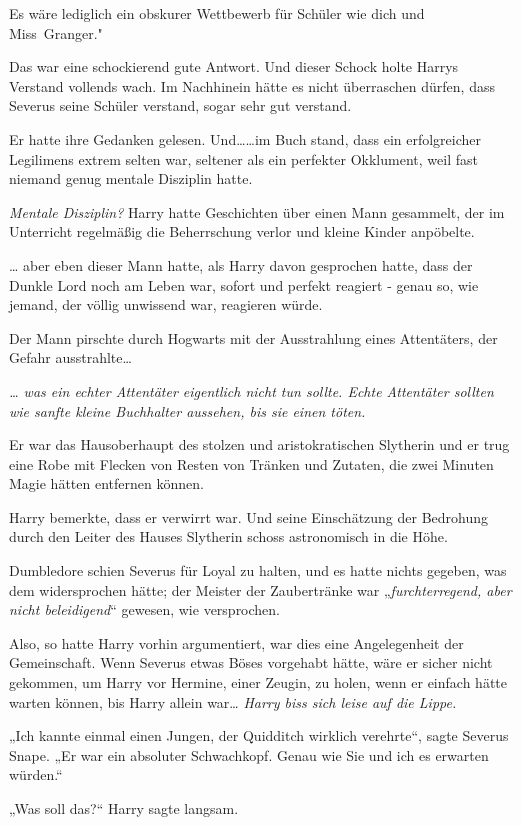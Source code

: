 {Es wäre lediglich ein obskurer Wettbewerb für Schüler wie dich und Miss~Granger."

Das war eine schockierend gute Antwort. Und dieser Schock holte Harrys Verstand vollends wach. Im Nachhinein hätte es nicht überraschen dürfen, dass Severus seine Schüler verstand, sogar sehr gut verstand.

Er hatte ihre Gedanken gelesen. Und……im Buch stand, dass ein erfolgreicher Legilimens extrem selten war, seltener als ein perfekter Okklument, weil fast niemand genug mentale Disziplin hatte.

\emph{Mentale Disziplin?} Harry hatte Geschichten über einen Mann gesammelt, der im Unterricht regelmäßig die Beherrschung verlor und kleine Kinder anpöbelte.

… aber eben dieser Mann hatte, als Harry davon gesprochen hatte, dass der Dunkle Lord noch am Leben war, sofort und perfekt reagiert - genau so, wie jemand, der völlig unwissend war, reagieren würde.

Der Mann pirschte durch Hogwarts mit der Ausstrahlung eines Attentäters, der Gefahr ausstrahlte…

\emph{… was ein echter Attentäter eigentlich nicht tun sollte. Echte Attentäter sollten wie sanfte kleine Buchhalter aussehen, bis sie einen töten.}

Er war das Hausoberhaupt des stolzen und aristokratischen Slytherin und er trug eine Robe mit Flecken von Resten von Tränken und Zutaten, die zwei Minuten Magie hätten entfernen können.

Harry bemerkte, dass er verwirrt war. Und seine Einschätzung der Bedrohung durch den Leiter des Hauses Slytherin schoss astronomisch in die Höhe.

Dumbledore schien Severus für Loyal zu halten, und es hatte nichts gegeben, was dem widersprochen hätte; der Meister der Zaubertränke war „\emph{furchterregend, aber nicht beleidigend}“ gewesen, wie versprochen.

Also, so hatte Harry vorhin argumentiert, war dies eine Angelegenheit der Gemeinschaft. Wenn Severus etwas Böses vorgehabt hätte, wäre er sicher nicht gekommen, um Harry vor Hermine, einer Zeugin, zu holen, wenn er einfach hätte warten können, bis Harry allein war… \emph{Harry biss sich leise auf die Lippe.}

„Ich kannte einmal einen Jungen, der Quidditch wirklich verehrte“, sagte Severus Snape. „Er war ein absoluter Schwachkopf. Genau wie Sie und ich es erwarten würden.“

„Was soll das?“ Harry sagte langsam.

}
